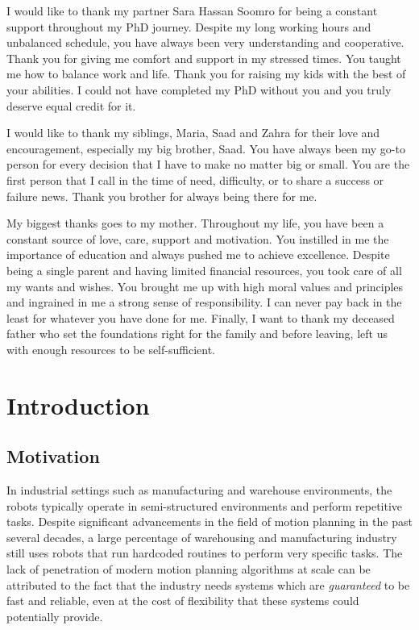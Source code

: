 \documentclass[a4paper]{report}
\begin{document}
I would like to thank my partner Sara Hassan Soomro for being a constant support throughout my PhD journey. Despite my long working hours and unbalanced schedule, you have always been very understanding and cooperative. Thank you for giving me comfort and support in my stressed times. You taught me how to balance work and life. Thank you for raising my kids with the best of your abilities. I could not have completed my PhD without you and you truly deserve equal credit for it.

I would like to thank my siblings, Maria, Saad and Zahra for their love and encouragement, especially my big brother, Saad. You have always been my go-to person for every decision that I have to make no matter big or small. You are the first person that I call in the time of need, difficulty, or to share a success or failure news. Thank you brother for always being there for me.

My biggest thanks goes to my mother. Throughout my life, you have been a constant source of love, care, support and motivation. You instilled in me the importance of education and always pushed me to achieve excellence. Despite being a single parent and having limited financial resources, you took care of all my wants and wishes. You brought me up with high moral values and principles and ingrained in me a strong sense of responsibility. I can never pay back in the least for whatever you have done for me. Finally, I want to thank my deceased father who set the foundations right for the family and before leaving, left us with enough resources to be self-sufficient.

\tableofcontents
\newpage

\chapter{Introduction}
\section{Motivation}
In industrial settings such as manufacturing and warehouse environments, the robots typically operate in semi-structured environments and perform repetitive tasks. Despite significant advancements in the field of motion planning in the past several decades, a large percentage of warehousing and manufacturing industry still uses robots that run hardcoded routines to perform very specific tasks. The lack of penetration of modern motion planning algorithms at scale can be attributed to the fact that the industry needs systems which are \emph{guaranteed} to be fast and reliable, even at the cost of flexibility that these systems could potentially provide.
\end{document}
